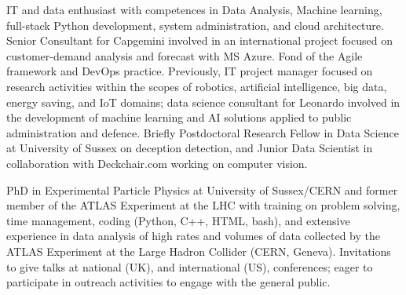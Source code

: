 
IT and data enthusiast with competences in Data Analysis, Machine learning, full-stack Python development, system administration, and cloud architecture. Senior Consultant for Capgemini involved in an international project focused on customer-demand analysis and forecast with MS Azure. Fond of the Agile framework and DevOps practice. Previously, IT project manager focused on research activities within the scopes of robotics, artificial intelligence, big data, energy saving, and IoT domains; data science consultant for Leonardo involved in the development of machine learning and AI solutions applied to public administration and defence. Briefly Postdoctoral Research Fellow in Data Science at University of Sussex on deception detection, and Junior Data Scientist in collaboration with Deckchair.com working on computer vision. 

PhD in Experimental Particle Physics at University of Sussex/CERN and former member of the ATLAS Experiment at the LHC with training on problem solving, time management, coding (Python, C++, HTML, bash), and extensive experience in data analysis of high rates and volumes of data collected by the ATLAS Experiment at the Large Hadron Collider (CERN, Geneva). Invitations to give talks at national (UK), and international (US), conferences; eager to participate in outreach activities to engage with the general public. 